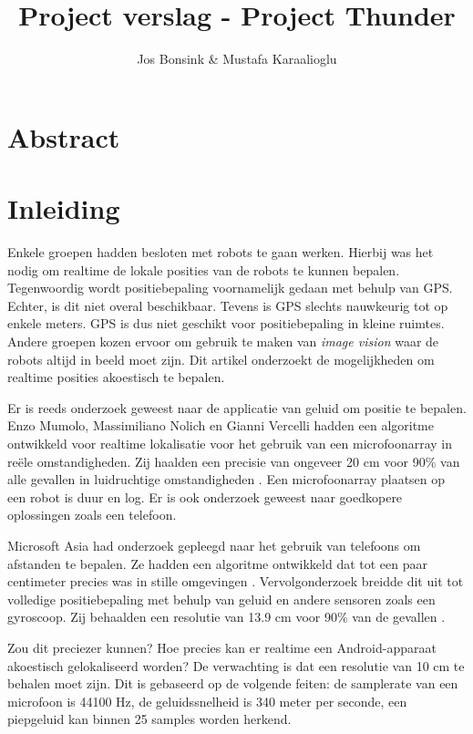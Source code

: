 \documentclass[12pt]{article}
\author{Jos Bonsink \& Mustafa Karaalioglu}
\begin{document}
\title{Project verslag - Project Thunder}
\maketitle

\section{Abstract}

\section{Inleiding}
Enkele groepen hadden besloten met robots te gaan werken. Hierbij was het nodig om realtime de lokale posities van de robots te kunnen bepalen. Tegenwoordig wordt positiebepaling voornamelijk gedaan met behulp van GPS. Echter, is dit niet overal beschikbaar. Tevens is GPS slechts nauwkeurig tot op enkele meters. GPS is dus niet geschikt voor positiebepaling in kleine ruimtes. Andere groepen kozen ervoor om gebruik te maken van \textit{image vision} waar de robots altijd in beeld moet zijn. Dit artikel onderzoekt de mogelijkheden om realtime \cite{stankovic1988misconceptions} posities akoestisch te bepalen.

Er is reeds onderzoek geweest naar de applicatie van geluid om positie te bepalen. Enzo Mumolo, Massimiliano Nolich en Gianni Vercelli hadden een algoritme ontwikkeld voor realtime lokalisatie voor het gebruik van een microfoonarray in re\"ele omstandigheden. Zij haalden een precisie van ongeveer 20 cm voor 90\% van alle gevallen in luidruchtige omstandigheden \cite{mumolo2003algorithms}. Een microfoonarray plaatsen op een robot is duur en log. Er is ook onderzoek geweest naar goedkopere oplossingen zoals een telefoon. 

Microsoft Asia had onderzoek gepleegd naar het gebruik van telefoons om afstanden te bepalen. Ze hadden een algoritme ontwikkeld dat tot een paar centimeter precies was in stille omgevingen \cite{peng2007beepbeep}. Vervolgonderzoek breidde dit uit tot volledige positiebepaling met behulp van geluid en andere sensoren zoals een gyroscoop. Zij behaalden een resolutie van 13.9 cm voor 90\% van de gevallen \cite{qiu2011feasibility}.

Zou dit preciezer kunnen? Hoe precies kan er realtime een Android-apparaat akoestisch gelokaliseerd worden? De verwachting is dat een resolutie van 10 cm te behalen moet zijn. Dit is gebaseerd op de volgende feiten: de samplerate van een microfoon is 44100 Hz, de geluidssnelheid is 340 meter per seconde, een piepgeluid kan binnen 25 samples worden herkend.
\end{document}
